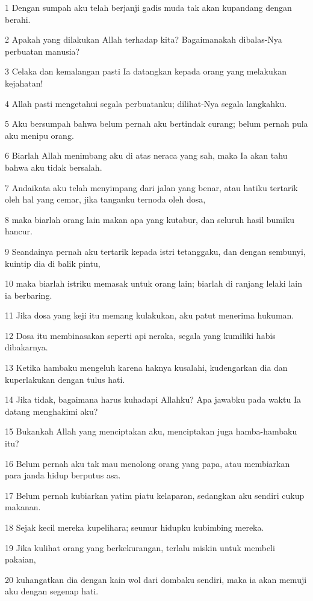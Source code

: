 \par 1 Dengan sumpah aku telah berjanji gadis muda tak akan kupandang dengan berahi.
\par 2 Apakah yang dilakukan Allah terhadap kita? Bagaimanakah dibalas-Nya perbuatan manusia?
\par 3 Celaka dan kemalangan pasti Ia datangkan kepada orang yang melakukan kejahatan!
\par 4 Allah pasti mengetahui segala perbuatanku; dilihat-Nya segala langkahku.
\par 5 Aku bersumpah bahwa belum pernah aku bertindak curang; belum pernah pula aku menipu orang.
\par 6 Biarlah Allah menimbang aku di atas neraca yang sah, maka Ia akan tahu bahwa aku tidak bersalah.
\par 7 Andaikata aku telah menyimpang dari jalan yang benar, atau hatiku tertarik oleh hal yang cemar, jika tanganku ternoda oleh dosa,
\par 8 maka biarlah orang lain makan apa yang kutabur, dan seluruh hasil bumiku hancur.
\par 9 Seandainya pernah aku tertarik kepada istri tetanggaku, dan dengan sembunyi, kuintip dia di balik pintu,
\par 10 maka biarlah istriku memasak untuk orang lain; biarlah di ranjang lelaki lain ia berbaring.
\par 11 Jika dosa yang keji itu memang kulakukan, aku patut menerima hukuman.
\par 12 Dosa itu membinasakan seperti api neraka, segala yang kumiliki habis dibakarnya.
\par 13 Ketika hambaku mengeluh karena haknya kusalahi, kudengarkan dia dan kuperlakukan dengan tulus hati.
\par 14 Jika tidak, bagaimana harus kuhadapi Allahku? Apa jawabku pada waktu Ia datang menghakimi aku?
\par 15 Bukankah Allah yang menciptakan aku, menciptakan juga hamba-hambaku itu?
\par 16 Belum pernah aku tak mau menolong orang yang papa, atau membiarkan para janda hidup berputus asa.
\par 17 Belum pernah kubiarkan yatim piatu kelaparan, sedangkan aku sendiri cukup makanan.
\par 18 Sejak kecil mereka kupelihara; seumur hidupku kubimbing mereka.
\par 19 Jika kulihat orang yang berkekurangan, terlalu miskin untuk membeli pakaian,
\par 20 kuhangatkan dia dengan kain wol dari dombaku sendiri, maka ia akan memuji aku dengan segenap hati.
